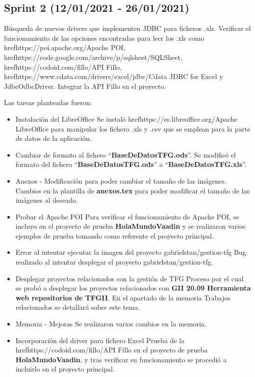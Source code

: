 
\subsection{Sprint 2 (12/01/2021 - 26/01/2021)}
Búsqueda de nuevos drivers que implementen JDBC para ficheros .xls. Verificar el funcionamiento de las opciones encontradas para leer los .xls como href{https://poi.apache.org/}{Apache POI}, href{https://code.google.com/archive/p/sqlsheet/}{SQLSheet}, href{https://codoid.com/fillo/}{API Fillo}, href{https://www.cdata.com/drivers/excel/jdbc/}{Cdata JDBC for Excel} y JdbcOdbcDriver. Integrar la API Fillo en el proyecto. 

Las tareas planteadas fueron:
\begin{itemize}
	\tightlist
	\item Instalación del LibreOffice 
		Se instaló href{https://es.libreoffice.org/}{Apache LibreOffice} para manipular los fichero .xls y .csv que se emplean para la parte de datos de la aplicación.
	\item Cambiar de formato al fichero ``\textbf{BaseDeDatosTFG.ods}''.
		Se modificó el formato del fichero ``\textbf{BaseDeDatosTFG.ods}'' a ``\textbf{BaseDeDatosTFG.xls}''.
	\item Anexos - Modificación para poder cambiar el tamaño de las imágenes.
		Cambios en la plantilla de \textbf{anexos.tex} para poder modificar el tamaño de las imágenes al deseado.
	\item Probar el Apache POI
		Para verificar el funcionamiento de Apache POI, se incluyo en el proyecto de prueba \textbf{HolaMundoVaadin} y se realizaron varios ejemplos de prueba tomando como referente el proyecto principal.
	\item Error al intentar ejecutar la imagen del proyecto gabrielstan/gestion-tfg
		Bug realizado al intentar desplegar el proyecto  gabrielstan/gestion-tfg.  
	\item Desplegar proyectos relacionados con la gestión de TFG
		Proceso por el cual se probó a desplegar los proyectos relacionados con \textbf{GII 20.09 Herramienta web repositorios de TFGII}. En el apartado de la memoria Trabajos relacionados se detallará sobre este tema. 
	\item Memoria - Mejoras
		Se realizaron varios cambios en la memoria.
	\item Incorporación del driver para fichero Excel
		Prueba de la href{https://codoid.com/fillo/}{API Fillo} en el proyecto de prueba \textbf{HolaMundoVaadin}, y tras verificar su funcionamiento se procedió a incluirlo en el proyecto principal.

\end{itemize}
